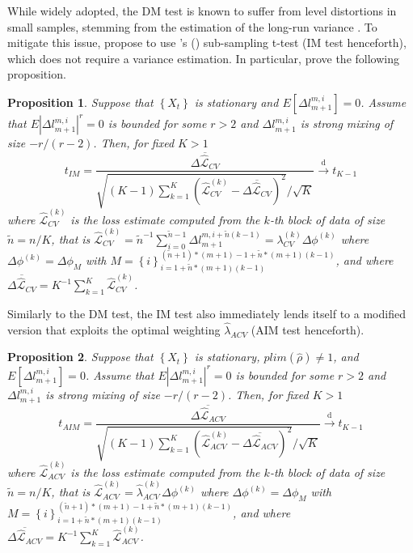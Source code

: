\documentclass[11pt,dvipsnames]{article}
\newtheorem{proposition}{Proposition}
\newcommand{\possessivecite}[1]{\citeauthor{#1}'s (\citeyear{#1})}
\begin{document}
While widely adopted, the DM test is known to suffer from level distortions in small samples, stemming from the estimation of the long-run variance  \citep[see][]{clarkChapter20Advances2013}. To mitigate this issue, \citet{zhuCanTwoForecasts2020} propose to use \possessivecite{ibragimovTStatisticBasedCorrelation2010} sub-sampling t-test (IM test henceforth), which does not require a variance estimation. In particular, \citet{zhuCanTwoForecasts2020} prove the following proposition.
\begin{proposition} \label{prop:PropositionIM}
Suppose that $ \left\lbrace X_{t} \right\rbrace  $ is stationary and $ E[\Delta l_{m+1}^{m,i}]= 0 $. Assume that $ E|\Delta l_{m+1}^{m,i}|^{r}= 0 $ is bounded for some $ r>2 $ and $ \Delta l_{m+1}^{m,i} $ is strong mixing of size $ -r/(r-2) $. Then, for fixed $ K > 1 $
\begin{equation}
t_{IM}=\dfrac{\overline{\Delta \widehat{\mathcal{L}}_{CV}}}{\sqrt{\left(K-1 \right)\sum_{k=1}^{K}\left( \widehat{\mathcal{L}}_{CV}^{(k)} -\overline{\Delta \widehat{\mathcal{L}}_{CV}} \right)^{2}}  /\sqrt{K} } \overset{\mathrm{d}}{\longrightarrow} t_{K-1}
\end{equation}
where $ \widehat{\mathcal{L}}_{CV}^{(k)} $ is the loss estimate computed from the $ k $-th block of data of size $ \tilde{n}=n/K $, that is $ \widehat{\mathcal{L}}_{CV}^{(k)}=\tilde{n} ^{-1}\sum_{i=0}^{\tilde{n}-1} \Delta l_{m+1}^{m,i + \tilde{n}(k-1)} = \lambda_{CV}^{(k)} \Delta \phi^{(k)} $ where $\Delta \phi^{(k)}= \Delta \phi_{M}$ with $ M=\left\lbrace i \right\rbrace_{i=1+\tilde{n}*(m+1)(k-1)}^{(\tilde{n}+1)*(m+1)-1+\tilde{n}*(m+1)(k-1)}  $, and where $ \overline{\Delta \widehat{\mathcal{L}}_{CV}}=K^{-1}\sum_{k=1}^{K} \widehat{\mathcal{L}}_{CV}^{(k)}$.
\end{proposition}
Similarly to the DM test, the IM test also immediately lends itself to a modified version that exploits the optimal weighting $ \widehat{\lambda}_{ACV} $ (AIM test henceforth).
\begin{proposition} \label{prop:PropositionAIM}
Suppose that $ \left\lbrace X_{t} \right\rbrace  $ is stationary, $ plim(\hat{\rho})\neq 1 $, and $ E[\Delta l_{m+1}^{m,i}]= 0 $. Assume that $ E|\Delta l_{m+1}^{m,i}|^{r}= 0 $ is bounded for some $ r>2 $ and $ \Delta l_{m+1}^{m,i} $ is strong mixing of size $ -r/(r-2) $. Then, for fixed $ K > 1 $
\begin{equation}
t_{AIM}=\dfrac{\overline{\Delta \widehat{\mathcal{L}}_{ACV}}}{\sqrt{\left(K-1 \right)\sum_{k=1}^{K}\left( \widehat{\mathcal{L}}_{ACV}^{(k)} -\overline{\Delta \widehat{\mathcal{L}}_{ACV}} \right)^{2}}  /\sqrt{K} } \overset{\mathrm{d}}{\longrightarrow} t_{K-1}
\end{equation}
where $ \widehat{\mathcal{L}}_{ACV}^{(k)} $ is the loss estimate computed from the $ k $-th block of data of size $ \tilde{n}=n/K $, that is $ \widehat{\mathcal{L}}_{ACV}^{(k)}= \widehat{\lambda}_{ACV}^{(k)} \Delta \phi^{(k)} $ where $\Delta \phi^{(k)}= \Delta \phi_{M}$ with $ M=\left\lbrace i \right\rbrace_{i=1+\tilde{n}*(m+1)(k-1)}^{(\tilde{n}+1)*(m+1)-1+\tilde{n}*(m+1)(k-1)}  $, and where $ \overline{\Delta \widehat{\mathcal{L}}_{ACV}}=K^{-1}\sum_{k=1}^{K} \widehat{\mathcal{L}}_{ACV}^{(k)}$.
\end{proposition}
\end{document}
